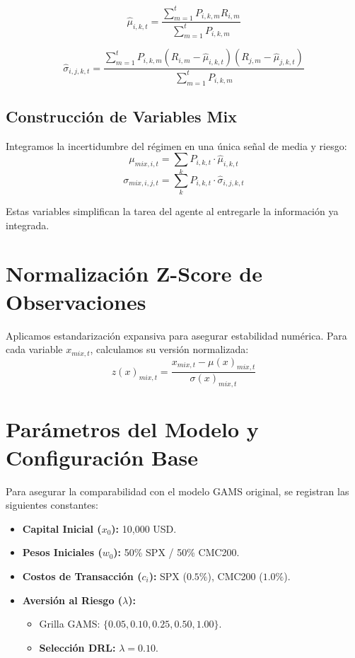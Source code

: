 \documentclass[12pt]{article}
\begin{document}
\begin{equation}
    \hat{\mu}_{i,k,t} = \frac{\sum_{m=1}^t P_{i,k,m} R_{i,m}}{\sum_{m=1}^t P_{i,k,m}}
\end{equation}

\begin{equation}
    \hat{\sigma}_{i,j,k,t} = \frac{\sum_{m=1}^t P_{i,k,m} (R_{i,m} - \hat{\mu}_{i,k,t})(R_{j,m} - \hat{\mu}_{j,k,t})}{\sum_{m=1}^t P_{i,k,m}}
\end{equation}

\subsection{Construcción de Variables Mix}
Integramos la incertidumbre del régimen en una única señal de media y riesgo:
\begin{equation}
    \mu_{mix, i,t} = \sum_{k} P_{i,k,t} \cdot \hat{\mu}_{i,k,t}
\end{equation}
\begin{equation}
    \sigma_{mix, i,j,t} = \sum_{k} P_{i,k,t} \cdot \hat{\sigma}_{i,j,k,t}
\end{equation}

Estas variables simplifican la tarea del agente al entregarle la información ya integrada.

\section{Normalización Z-Score de Observaciones}

Aplicamos estandarización expansiva para asegurar estabilidad numérica. Para cada variable $x_{mix, t}$, calculamos su versión normalizada:
\begin{equation}
    z(x)_{mix, t} = \frac{x_{mix, t} - \mu(x)_{mix, t}}{\sigma(x)_{mix, t}}
\end{equation}

\section{Parámetros del Modelo y Configuración Base}

Para asegurar la comparabilidad con el modelo GAMS original, se registran las siguientes constantes:

\begin{itemize}
    \item \textbf{Capital Inicial ($x_0$):} 10,000 USD.
    \item \textbf{Pesos Iniciales ($w_0$):} 50\% SPX / 50\% CMC200.
    \item \textbf{Costos de Transacción ($c_i$):} SPX ($0.5\%$), CMC200 ($1.0\%$).
    \item \textbf{Aversión al Riesgo ($\lambda$):}
    \begin{itemize}
        \item Grilla GAMS: $\{0.05, 0.10, 0.25, 0.50, 1.00\}$.
        \item \textbf{Selección DRL:} $\lambda = 0.10$.
    \end{itemize}
\end{itemize}
\end{document}
